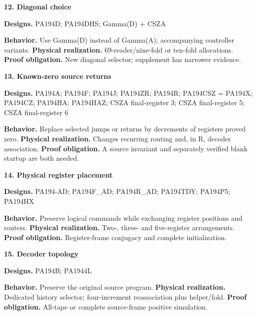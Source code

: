 \documentclass[10pt,a4paper]{article}
\begin{document}
\par\medskip\begin{samepage}\noindent\textbf{12. Diagonal choice}\par\nobreak
\textbf{Designs.} PA194\allowbreak{}D;\allowbreak{} PA194\allowbreak{}DHS;\allowbreak{} Gamma(D) + CSZA

\textbf{Behavior.} Use Gamma(D) instead of Gamma(A); accompanying controller variants. \textbf{Physical realization.} 69-reader/nine-fold or ten-fold allocations. \textbf{Proof obligation.} New diagonal selector; supplement has narrower evidence.
\end{samepage}

\par\medskip\begin{samepage}\noindent\textbf{13. Known-zero source returns}\par\nobreak
\textbf{Designs.} PA194\allowbreak{}A;\allowbreak{} PA194\allowbreak{}F;\allowbreak{} PA194\allowbreak{}J;\allowbreak{} PA194\allowbreak{}ZR;\allowbreak{} PA194\allowbreak{}R;\allowbreak{} PA194\allowbreak{}CSZ = PA194\allowbreak{}X;\allowbreak{} PA194\allowbreak{}CZ;\allowbreak{} PA194\allowbreak{}HA;\allowbreak{} PA194\allowbreak{}HAZ;\allowbreak{} CSZA final-register 3;\allowbreak{} CSZA final-register 5;\allowbreak{} CSZA final-register 6

\textbf{Behavior.} Replace selected jumps or returns by decrements of registers proved zero. \textbf{Physical realization.} Changes recurring routing and, in R, decoder association. \textbf{Proof obligation.} A source invariant and separately verified blank startup are both needed.
\end{samepage}

\par\medskip\begin{samepage}\noindent\textbf{14. Physical register placement}\par\nobreak
\textbf{Designs.} PA194\allowbreak{}-AD;\allowbreak{} PA194\allowbreak{}F\_AD;\allowbreak{} PA194\allowbreak{}R\_AD;\allowbreak{} PA194\allowbreak{}TDY;\allowbreak{} PA194\allowbreak{}P5;\allowbreak{} PA194\allowbreak{}HX

\textbf{Behavior.} Preserve logical commands while exchanging register positions and routers. \textbf{Physical realization.} Two-, three- and five-register arrangements. \textbf{Proof obligation.} Register-frame conjugacy and complete initialization.
\end{samepage}

\par\medskip\begin{samepage}\noindent\textbf{15. Decoder topology}\par\nobreak
\textbf{Designs.} PA194\allowbreak{}B;\allowbreak{} PA194\allowbreak{}4L

\textbf{Behavior.} Preserve the original source program. \textbf{Physical realization.} Dedicated history selector; four-increment reassociation plus helper/fold. \textbf{Proof obligation.} All-tape or complete source-frame positive simulation.
\end{samepage}
\end{document}
